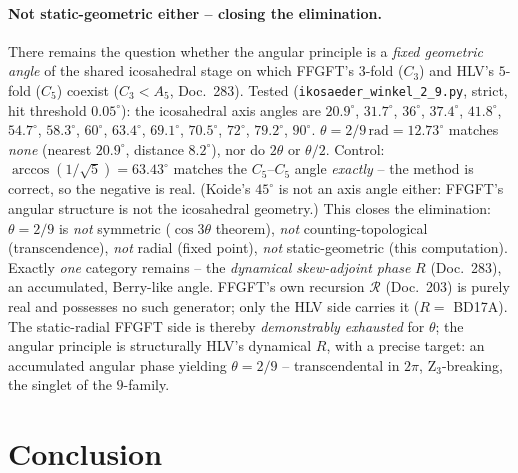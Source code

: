 \paragraph{Not static-geometric either -- closing the elimination.} There remains the question whether the
angular principle is a \emph{fixed geometric angle} of the shared icosahedral stage on which FFGFT's
$3$-fold ($C_3$) and HLV's $5$-fold ($C_5$) coexist ($C_3<A_5$, Doc.~283). Tested
(\texttt{ikosaeder\_winkel\_2\_9.py}, strict, hit threshold $0.05^\circ$): the icosahedral axis angles are
$20.9^\circ$, $31.7^\circ$, $36^\circ$, $37.4^\circ$, $41.8^\circ$, $54.7^\circ$, $58.3^\circ$, $60^\circ$,
$63.4^\circ$, $69.1^\circ$, $70.5^\circ$, $72^\circ$, $79.2^\circ$, $90^\circ$.
$\theta=2/9\,\mathrm{rad}=12.73^\circ$ matches \emph{none} (nearest $20.9^\circ$, distance $8.2^\circ$),
nor do $2\theta$ or $\theta/2$. Control: $\arccos(1/\sqrt5)=63.43^\circ$ matches the $C_5$--$C_5$ angle
\emph{exactly} -- the method is correct, so the negative is real. (Koide's $45^\circ$ is not an axis angle
either: FFGFT's angular structure is not the icosahedral geometry.) This closes the elimination:
$\theta=2/9$ is \emph{not} symmetric ($\cos3\theta$ theorem), \emph{not} counting-topological
(transcendence), \emph{not} radial (fixed point), \emph{not} static-geometric (this computation). Exactly
\emph{one} category remains -- the \emph{dynamical skew-adjoint phase} $R$ (Doc.~283), an accumulated,
Berry-like angle. FFGFT's own recursion $\mathcal R$ (Doc.~203) is purely real and possesses no such
generator; only the HLV side carries it ($R=$ BD17A). The static-radial FFGFT side is thereby
\emph{demonstrably exhausted} for $\theta$; the angular principle is structurally HLV's dynamical $R$,
with a precise target: an accumulated angular phase yielding $\theta=2/9$ -- transcendental in $2\pi$,
Z$_3$-breaking, the singlet of the $9$-family.

\section{Conclusion}

